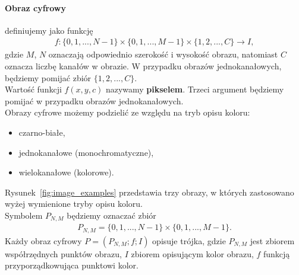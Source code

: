 \paragraph{Obraz cyfrowy} definiujemy jako funkcję
\begin{gather*}
  f: \{0, 1, ..., N-1\} \times \{0, 1, ..., M-1\} \times \{1, 2, ..., C\} \rightarrow I,
\end{gather*}
gdzie $M$, $N$ oznaczają odpowiednio szerokość i wysokość obrazu, natomiast $C$ oznacza liczbę kanałów w obrazie. W przypadku obrazów jednokanałowych, będziemy pomijać zbiór $\{1, 2, ..., C\}$.\\
Wartość funkcji $f(x, y, c)$ nazywamy \textbf{pikselem}. Trzeci argument będziemy pomijać w przypadku obrazów jednokanałowych. \\
Obrazy cyfrowe możemy podzielić ze względu na tryb opisu koloru:
\begin{itemize}
  \item czarno-białe,
  \item jednokanałowe (monochromatyczne),
  \item wielokanałowe (kolorowe).
\end{itemize}
Rysunek~\ref{fig:image_examples} przedstawia trzy obrazy, w których zastosowano wyżej wymienione tryby opisu koloru.\\
Symbolem $P_{N,M}$ będziemy oznaczać zbiór
\begin{gather*}
  P_{N,M} = \{0, 1, ..., N-1\} \times \{0, 1, ..., M-1\}.
\end{gather*}
Każdy obraz cyfrowy $P = (P_{N,M}; f; I)$ opisuje trójka, gdzie $P_{N,M}$ jest zbiorem współrzędnych punktów obrazu, $I$ zbiorem opisującym kolor obrazu, $f$ funkcją przyporządkowująca punktowi kolor.


